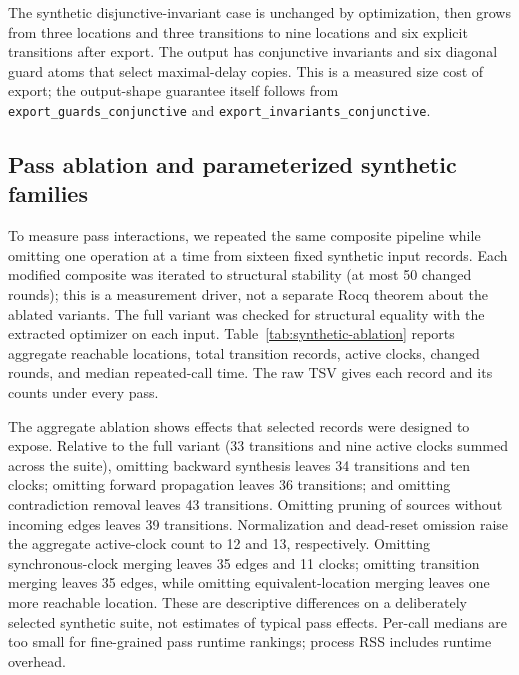 The synthetic disjunctive-invariant case is unchanged by optimization, then
grows from three locations and three transitions to nine locations and six
explicit transitions after export. The output has conjunctive invariants and
six diagonal guard atoms that select maximal-delay copies. This is a
measured size cost of export; the output-shape guarantee itself follows from
\texttt{export\_guards\_conjunctive} and
\texttt{export\_invariants\_conjunctive}.

\subsection{Pass ablation and parameterized synthetic families}
To measure pass interactions, we repeated the same composite pipeline while
omitting one operation at a time from sixteen fixed synthetic input records. Each
modified composite was iterated to structural stability (at most 50 changed
rounds); this is a measurement driver, not a separate Rocq theorem about the
ablated variants. The full variant was checked for structural equality with
the extracted optimizer on each input. Table~\ref{tab:synthetic-ablation}
reports aggregate reachable locations, total transition records, active
clocks, changed rounds, and median repeated-call time. The raw TSV gives each
record and its counts under every pass.

The aggregate ablation shows effects that selected records were designed to
expose. Relative to the full variant (33 transitions and nine active clocks
summed across the suite), omitting backward synthesis leaves 34 transitions
and ten clocks; omitting forward propagation leaves 36 transitions; and
omitting contradiction removal leaves 43 transitions. Omitting pruning of
sources without incoming edges leaves 39 transitions. Normalization and
dead-reset omission raise the aggregate active-clock count to 12 and 13,
respectively. Omitting synchronous-clock merging leaves 35 edges and 11
clocks; omitting transition merging leaves 35 edges, while omitting
equivalent-location merging leaves one more reachable location. These are
descriptive differences on a deliberately selected synthetic suite, not
estimates of typical pass effects. Per-call medians are too small for
fine-grained pass runtime rankings; process RSS includes runtime overhead.


